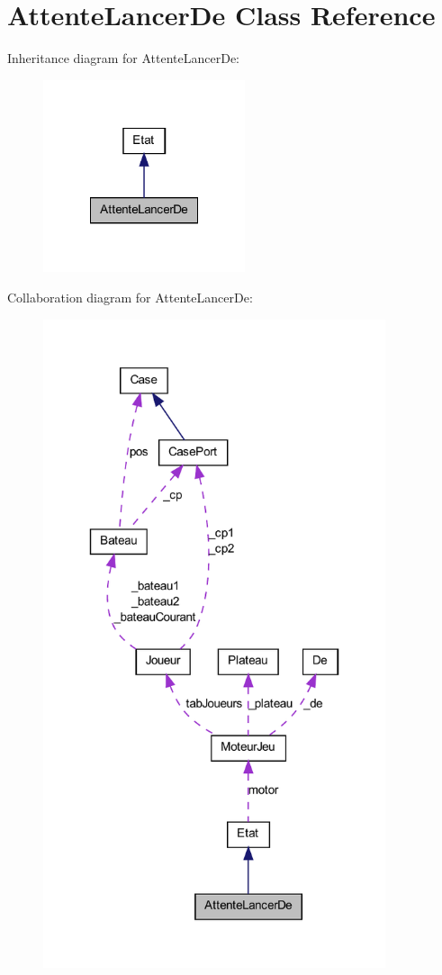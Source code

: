 \hypertarget{class_attente_lancer_de}{
\section{AttenteLancerDe Class Reference}
\label{class_attente_lancer_de}
}


Inheritance diagram for AttenteLancerDe:
\nopagebreak
\begin{figure}[H]
\begin{center}
\leavevmode
\includegraphics[width=168pt]{class_attente_lancer_de__inherit__graph}
\end{center}
\end{figure}


Collaboration diagram for AttenteLancerDe:
\nopagebreak
\begin{figure}[H]
\begin{center}
\leavevmode
\includegraphics[width=285pt]{class_attente_lancer_de__coll__graph}
\end{center}
\end{figure}
